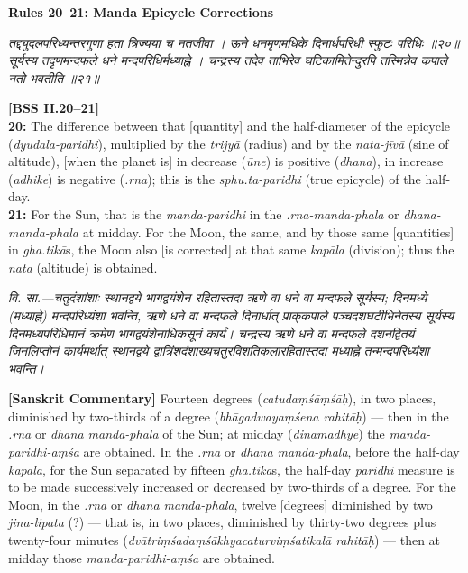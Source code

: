 \documentclass[11pt,a4paper]{book}
\newcommand{\dev}[1]{{\devanagarifont #1}}
\newcommand{\shlokabilingual}[2]{%
  \par\vspace{0.8em}%
  \noindent\begin{minipage}[t]{0.48\textwidth}
    \RaggedRight
    \dev{\textit{#1}}
  \end{minipage}%
  \hfill
  \begin{minipage}[t]{0.48\textwidth}
    \RaggedRight
    #2%
  \end{minipage}%
  \par\vspace{0.8em}%
}
\newcommand{\sktcommbilingual}[2]{%
  \par\vspace{0.5em}%
  \noindent\begin{minipage}[t]{0.48\textwidth}
    \RaggedRight\small\itshape
    \dev{#1}
  \end{minipage}%
  \hfill
  \begin{minipage}[t]{0.48\textwidth}
    \RaggedRight\small
    #2%
  \end{minipage}%
  \par\vspace{0.5em}%
}
\newcommand{\ruleheadingbilingual}[2]{%
  \par\vspace{0.8em}%
  \noindent\begin{minipage}[t]{0.48\textwidth}
    \textbf{\color{sectioncolor}\dev{#1}}
  \end{minipage}%
  \hfill
  \begin{minipage}[t]{0.48\textwidth}
    \textbf{\color{sectioncolor}#2}
  \end{minipage}%
  \par\vspace{0.4em}%
}
\begin{document}
\ruleheadingbilingual{नियमाः २०--२१}{Rules 20--21: Manda Epicycle Corrections}

\shlokabilingual{%
तद्द्युदलपरिध्यन्तरगुणा हता त्रिज्यया च नतजीवा ।
ऊने धनमृणमधिके दिनार्धपरिधी स्फुटः परिधिः ॥२०॥
सूर्यस्य तदृणमन्दफले धने मन्दपरिधिर्मध्याह्ने ।
चन्द्रस्य तदेव ताभिरेव घटिकामितेन्दुरपि तस्मिन्नेव कपाले नतो भवतीति ॥२१॥
}{%
\textbf{[BSS II.20--21]}\\[0.3em]
\textbf{20:} The difference between that [quantity] and the half-diameter of the epicycle (\textit{dyudala-paridhi}), multiplied by the \textit{trijyā} (radius) and by the \textit{nata-jīvā} (sine of altitude), [when the planet is] in decrease (\textit{ūne}) is positive (\textit{dhana}), in increase (\textit{adhike}) is negative (\textit{.rna}); this is the \textit{sphu.ta-paridhi} (true epicycle) of the half-day.\\[0.3em]
\textbf{21:} For the Sun, that is the \textit{manda-paridhi} in the \textit{.rna-manda-phala} or \textit{dhana-manda-phala} at midday. For the Moon, the same, and by those same [quantities] in \textit{gha.tikā}s, the Moon also [is corrected] at that same \textit{kapāla} (division); thus the \textit{nata} (altitude) is obtained.
}

\sktcommbilingual{%
\dev{वि. सा.}---चतुदंशांशाः स्थानद्वये भागद्वयंशेन रहितास्तदा ऋणे वा धने वा मन्दफले सूर्यस्य; दिनमध्ये (मध्याह्ने) मन्दपरिध्यंशा भवन्ति, ऋणे धने वा मन्दफले दिनार्धात्‌ प्राक्‌कपाले पञ्चदशघटीभिनेतस्य सूर्यस्य दिनमध्यपरिधिमानं क्रमेण भागद्वयंशेनाधिकसूनं कार्यं। चन्द्रस्य ऋणे धने वा मन्दफले दशनद्वितयं जिनलिप्तोनं कार्यमर्थात्‌ स्थानद्वये द्वात्रिंशदंशाख्यचतुरविशतिकलारहितास्तदा मध्याह्ने तन्मन्दपरिध्यंशा भवन्ति।
}{%
\textbf{[Sanskrit Commentary]} Fourteen degrees (\textit{catudaṃśāṃśāḥ}), in two places, diminished by two-thirds of a degree (\textit{bhāgadwayaṃśena rahitāḥ}) --- then in the \textit{.rna} or \textit{dhana manda-phala} of the Sun; at midday (\textit{dinamadhye}) the \textit{manda-paridhi-aṃśa} are obtained. In the \textit{.rna} or \textit{dhana manda-phala}, before the half-day \textit{kapāla}, for the Sun separated by fifteen \textit{gha.tikā}s, the half-day \textit{paridhi} measure is to be made successively increased or decreased by two-thirds of a degree. For the Moon, in the \textit{.rna} or \textit{dhana manda-phala}, twelve [degrees] diminished by two \textit{jina-lipata} (?) --- that is, in two places, diminished by thirty-two degrees plus twenty-four minutes (\textit{dvātriṃśadaṃśākhyacaturviṃśatikalā rahitāḥ}) --- then at midday those \textit{manda-paridhi-aṃśa} are obtained.
}
\end{document}
